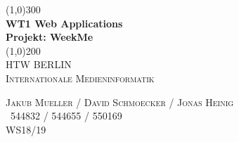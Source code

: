 \documentclass[11pt]{article}
\begin{document}
\begin{titlepage} 
	\begin{center}
	\line(1,0){300} \\
	[4mm]
	\huge{\bfseries WT1 Web Applications \\ Projekt: WeekMe} \\  
	[2mm]
	\line(1,0){200}\\	
	[1.5cm]
	\textsc{\LARGE HTW BERLIN}\\
	[0.75cm]
	\textsc{\LARGE Internationale Medieninformatik} \\  
	[9cm]
	\end{center}	 
	\begin{flushright}
		\textsc{\large Jakub Mueller / David Schmoecker / Jonas Heinig \\
		\ 544832 / 544655 / 550169 \\
		WS18/19\\}
	\end{flushright}  
	 
	
	
\end{titlepage}  
 

\tableofcontents
  
\cleardoublepage %




\setcounter{page}{1} %
 




\listoffigures
{}   
 
\listoftables
{} 
\cleardoublepage 


  
\end{document}
